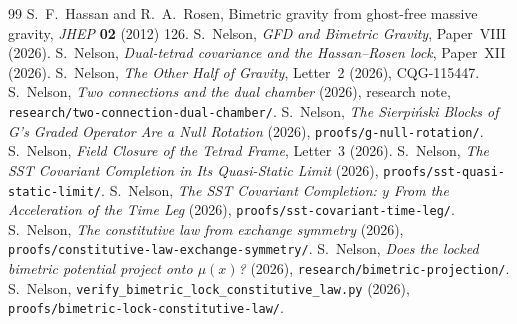 \documentclass[twocolumn]{iopjournal}
\begin{document}
\begin{thebibliography}{99}
 S.~F.~Hassan and R.~A.~Rosen, Bimetric gravity from
ghost-free massive gravity, \textit{JHEP} \textbf{02} (2012) 126.
 S.~Nelson, \textit{GFD and Bimetric Gravity},
Paper~VIII (2026).
 S.~Nelson, \textit{Dual-tetrad covariance and the
Hassan--Rosen lock}, Paper~XII (2026).
 S.~Nelson, \textit{The Other Half of Gravity},
Letter~2 (2026), CQG-115447.
 S.~Nelson, \textit{Two connections and the
dual chamber} (2026), research note,
\texttt{research/two-connection-\linebreak dual-chamber/}.
 S.~Nelson, \textit{The Sierpiński Blocks of G's
Graded Operator Are a Null Rotation} (2026),
\texttt{proofs/g-null-rotation/}.
 S.~Nelson, \textit{Field Closure of the Tetrad
Frame}, Letter~3 (2026).
 S.~Nelson, \textit{The SST Covariant Completion in
Its Quasi-Static Limit} (2026), \texttt{proofs/sst-quasi-static-limit/}.
 S.~Nelson, \textit{The SST Covariant Completion: $y$
From the Acceleration of the Time Leg} (2026),
\texttt{proofs/\linebreak sst-covariant-time-leg/}.
 S.~Nelson, \textit{The constitutive law from
exchange symmetry} (2026),
\texttt{proofs/constitutive-law-\linebreak exchange-symmetry/}.
 S.~Nelson, \textit{Does the locked bimetric
potential project onto $\mu(x)$?} (2026),
\texttt{research/bimetric-projection/}.
 S.~Nelson,
\texttt{verify\_bimetric\_lock\_\linebreak constitutive\_law.py} (2026),
\texttt{proofs/bimetric-lock-\linebreak constitutive-law/}.
\end{thebibliography}
\end{document}
